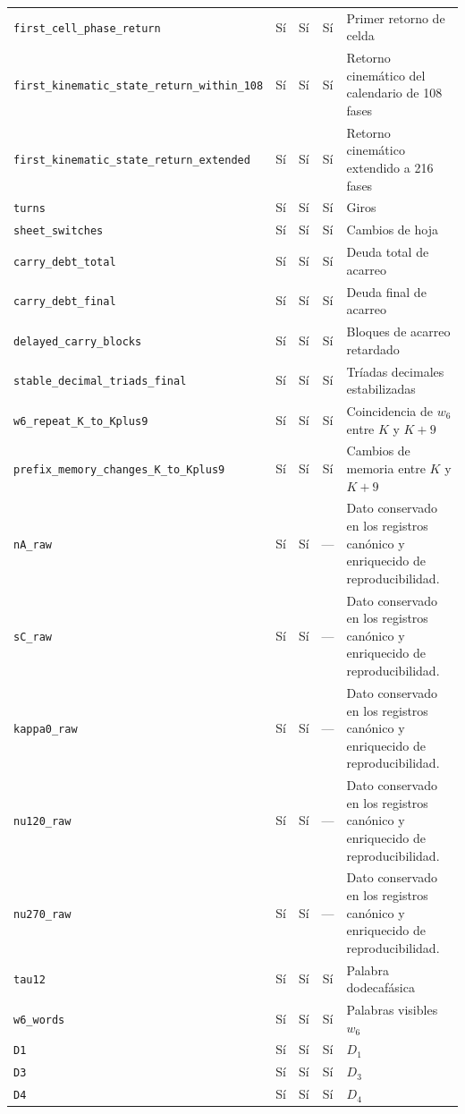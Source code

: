 \begin{longtable}{p{}ccc p{}}
\nolinkurl{first_cell_phase_return} & Sí & Sí & Sí & Primer retorno de celda \\
\nolinkurl{first_kinematic_state_return_within_108} & Sí & Sí & Sí & Retorno cinemático del calendario de 108 fases \\
\nolinkurl{first_kinematic_state_return_extended} & Sí & Sí & Sí & Retorno cinemático extendido a 216 fases \\
\nolinkurl{turns} & Sí & Sí & Sí & Giros \\
\nolinkurl{sheet_switches} & Sí & Sí & Sí & Cambios de hoja \\
\nolinkurl{carry_debt_total} & Sí & Sí & Sí & Deuda total de acarreo \\
\nolinkurl{carry_debt_final} & Sí & Sí & Sí & Deuda final de acarreo \\
\nolinkurl{delayed_carry_blocks} & Sí & Sí & Sí & Bloques de acarreo retardado \\
\nolinkurl{stable_decimal_triads_final} & Sí & Sí & Sí & Tríadas decimales estabilizadas \\
\nolinkurl{w6_repeat_K_to_Kplus9} & Sí & Sí & Sí & Coincidencia de \(w_6\) entre \(K\) y \(K+9\) \\
\nolinkurl{prefix_memory_changes_K_to_Kplus9} & Sí & Sí & Sí & Cambios de memoria entre \(K\) y \(K+9\) \\
\nolinkurl{nA_raw} & Sí & Sí & --- & Dato conservado en los registros canónico y enriquecido de reproducibilidad. \\
\nolinkurl{sC_raw} & Sí & Sí & --- & Dato conservado en los registros canónico y enriquecido de reproducibilidad. \\
\nolinkurl{kappa0_raw} & Sí & Sí & --- & Dato conservado en los registros canónico y enriquecido de reproducibilidad. \\
\nolinkurl{nu120_raw} & Sí & Sí & --- & Dato conservado en los registros canónico y enriquecido de reproducibilidad. \\
\nolinkurl{nu270_raw} & Sí & Sí & --- & Dato conservado en los registros canónico y enriquecido de reproducibilidad. \\
\nolinkurl{tau12} & Sí & Sí & Sí & Palabra dodecafásica \\
\nolinkurl{w6_words} & Sí & Sí & Sí & Palabras visibles \(w_6\) \\
\nolinkurl{D1} & Sí & Sí & Sí & \(D_1\) \\
\nolinkurl{D3} & Sí & Sí & Sí & \(D_3\) \\
\nolinkurl{D4} & Sí & Sí & Sí & \(D_4\) \\

\end{longtable}
